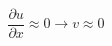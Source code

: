\documentclass[preview,border=2pt]{standalone}
\begin{document}
\[
\frac{\partial u}{\partial x} \approx 0 \rightarrow v \approx 0
\]
\end{document}
